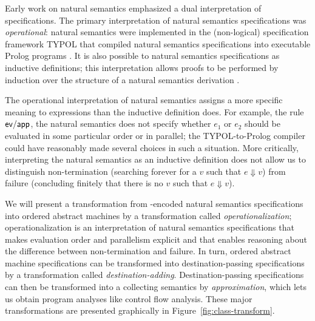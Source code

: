 Early work on natural semantics emphasized a dual interpretation of
specifications. The primary interpretation of natural semantics
specifications was {\it operational}: natural semantics were
implemented in the (non-logical) specification framework TYPOL that
compiled natural semantics specifications into executable Prolog
programs \cite{clement85natural}. It is also possible to natural
semantics specifications as inductive definitions; this interpretation
allows proofs to be performed by induction over the structure of a
natural semantics derivation \cite{clement86simple}.

The operational interpretation of natural semantics assigns a more
specific meaning to expressions than the inductive definition does.
For example, the rule ${\sf ev/app}$, the natural semantics does not
specify whether $e_1$ or $e_2$ should be evaluated in some particular
order or in parallel; the TYPOL-to-Prolog compiler could have
reasonably made several choices in such a situation. More critically,
interpreting the natural semantics as an inductive definition does not
allow us to distinguish non-termination (searching forever for a $v$
such that $e \Downarrow v$) from failure (concluding finitely that
there is no $v$ such that $e \Downarrow v$).

We will present a transformation from \sls-encoded natural semantics
specifications into ordered abstract machines by a transformation
called {\it operationalization}; operationalization is an
interpretation of natural semantics specifications that makes
evaluation order and parallelism explicit and that enables reasoning
about the difference between non-termination and failure. In turn,
ordered abstract machine specifications can be transformed into
destination-passing specifications by a transformation called {\it
  destination-adding}.  Destination-passing specifications can then be
transformed into a collecting semantics by {\it approximation}, which
lets us obtain program analyses like control flow analysis. These
major transformations are presented graphically in
Figure~\ref{fig:class-transform}.

